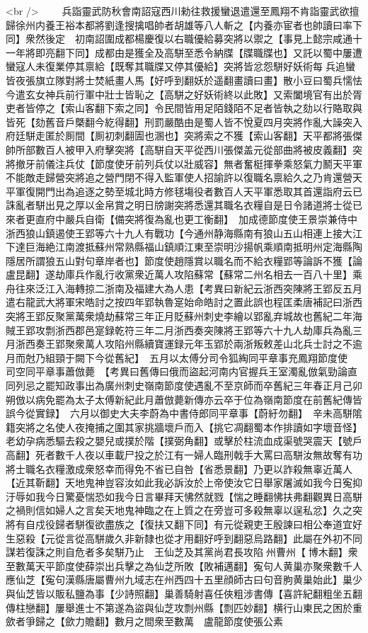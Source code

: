 <br />
　　兵詣靈武防秋會南詔寇西川勑往救援蠻退遣還至鳳翔不肯詣靈武欲擅歸徐州内養王裕本都將劉逢搜擒唱帥者胡雄等八人斬之【内養亦宦者也帥讀曰率下同】衆然後定　初南詔圍成都楊慶復以右職優給募突將以禦之【事見上懿宗咸通十一年將即亮翻下同】成都由是獲全及高駢至悉令納牒【牒職牒也】又託以蜀中屢遭蠻寇人未復業停其禀給【既奪其職牒又停其優給】突將皆忿怨駢好妖術每兵追蠻皆夜張旗立隊對將士焚紙畫人馬【好呼到翻妖於遥翻畫讀曰畫】散小豆曰蜀兵懦怯今遣玄女神兵前行軍中壯士皆恥之【高駢之好妖術終以此敗】又索闔境官有出於胥吏者皆停之【索山客翻下索之同】令民間皆用足陌錢陌不足者皆執之劾以行賂取與皆死【劾舊音戶槩翻今紇得翻】刑罰嚴酷由是蜀人皆不悅夏四月突將作亂大譟突入府廷駢走匿於厠間【厠初刺翻圊也溷也】突將索之不獲【索山客翻】天平都將張傑帥所部數百人被甲入府擊突將【高駢自天平從西川張傑盖元從部曲將被皮義翻】突將撤牙前儀注兵仗【節度使牙前列兵仗以壯威容】無者奮梃揮拳乘怒氣力鬭天平軍不能敵走歸營突將追之營門閉不得入監軍使人招諭許以復職名禀給久之乃肯還營天平軍復開門出為追逐之勢至城北時方修毬塲役者數百人天平軍悉取其首還詣府云已誅亂者駢出見之厚以金帛賞之明日牓謝突將悉還其職名衣糧自是日令諸道將士從已來者更直府中嚴兵自衛【備突將復為亂也更工衡翻】　加成德節度使王景崇兼侍中　浙西狼山鎮遏使王郢等六十九人有戰功【今通州静海縣南有狼山五山相連上接大江下達巨海絶江南渡抵蘇州常熟縣福山鎮順江東至崇明沙揚帆乘順南抵明州定海縣陶隱居所謂狼五山對句章岸者也】節度使趙隱賞以職名而不給衣糧郢等論訴不獲【論盧昆翻】遂劫庫兵作亂行收黨衆近萬人攻陷蘇常【蘇常二州名相去一百八十里】乘舟往來泛江入海轉掠二浙南及福建大為人患【考異曰新紀云浙西突陳將王郢反五月遣右龍武大將軍宋皓討之按四年郢執魯寔始命皓討之置此誤也程匡柔唐補記曰浙西突將王郢反聚黨萬衆燒劫蘇常三年正月貶蘇州刺史李繪以郢亂弃城故也舊紀二年海賊王郢攻剽浙西郡邑寔録乾符三年二月浙西奏突陳將王郢等六十九人劫庫兵為亂三月浙西奏王郢聚衆萬人攻陷州縣續寶運録元年玉郢於兩浙叛敕差山北兵士討之不逾月而尅乃組頸于闕下今從舊紀】　五月以太傅分司令狐綯同平章事充鳳翔節度使　司空同平章事蕭倣薨　【考異曰舊傳曰俄而盜起河南内官握兵王室濁亂倣氣勁論直同列忌之罷知政事出為廣州刺史嶺南節度使遇亂不至京師而卒舊紀三年春正月己卯朔倣以病免罷為太子太傅新紀此月蕭倣薨新傳亦云卒于位為嶺南節度在前舊紀傳皆誤今從實録】　六月以御史大夫李蔚為中書侍郎同平章事【蔚紆勿翻】　辛未高駢隂籍突將之名使人夜掩捕之圍其家挑牆壞戶而入【挑它凋翻蜀本作排讀如字壞音怪】老幼孕病悉驅去殺之嬰兒或撲於階【撲弼角翻】或擊於柱流血成渠號哭震天【號戶高翻】死者數千人夜以車載尸投之於江有一婦人臨刑戟手大罵曰高駢汝無故奪有功將士職名衣糧激成衆怒幸而得免不省已自咎【省悉景翻】乃更以詐殺無辜近萬人【近其靳翻】天地鬼神豈容汝如此我必訴汝於上帝使汝它日舉家屠滅如我今日寃抑汙辱如我今日驚憂惴恐如我今日言畢拜天怫然就戮【惴之睡翻怫扶弗翻觀異日高駢之禍則信如婦人之言矣天地鬼神臨之在上質之在旁豈可多殺無辜以逞私忿】久之突將有自戍役歸者駢復欲盡族之【復扶又翻下同】有元從親吏王殷諫曰相公奉道宜好生惡殺【元從言從高駢歲久非新隸也從才用翻好呼到翻惡烏路翻】此屬在外初不同謀若復誅之則自危者多矣駢乃止　王仙芝及其黨尚君長攻陷州曹州【博木翻】衆至數萬天平節度使薛崇出兵擊之為仙芝所敗【敗補邁翻】寃句人黄巢亦聚衆數千人應仙芝【寃句漢縣唐屬曹州九域志在州西四十五里顔師古曰句音胊黄巢始此】巢少與仙芝皆以販私鹽為事【少詩照翻】巢善騎射喜任俠粗涉書傳【喜許紀翻粗坐五翻傳柱戀翻】屢舉進士不第遂為盜與仙芝攻剽州縣【剽匹妙翻】横行山東民之困於重歛者爭歸之【歛力贍翻】數月之間衆至數萬　盧龍節度使張公素
